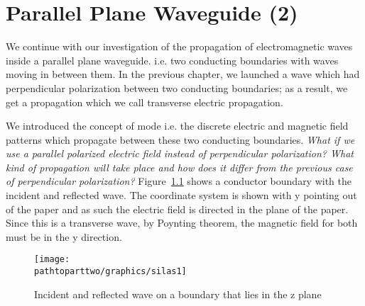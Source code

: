 \chapter{Parallel Plane Waveguide (2)}\label{lec:lec36}
We continue with our investigation of the propagation of electromagnetic waves inside a parallel plane waveguide. i.e. two conducting boundaries with waves moving in between them. In the previous chapter, we launched a wave which had perpendicular polarization between two conducting boundaries; as a result, we get a propagation which we call transverse electric propagation.

We introduced the concept of mode i.e. the discrete electric and magnetic field patterns which propagate between these two conducting boundaries. \emph{What if we use a parallel polarized electric field instead of perpendicular polarization? What kind of propagation will take place and how does it differ from the previous case of perpendicular polarization?} Figure~\ref{fig:silas1} shows a conductor boundary with the incident and reflected wave. The coordinate system is shown with y pointing out of the paper and as such the electric field is directed in the plane of the paper. Since this is a transverse wave, by Poynting theorem, the magnetic field for both must be in the y direction.
\begin{figure}[h]
\centering
\texttt{[image: \\pathtoparttwo/graphics/silas1]}
\caption{Incident and reflected wave on a boundary that lies in the z plane}
\label{fig:silas1}
\end{figure}

